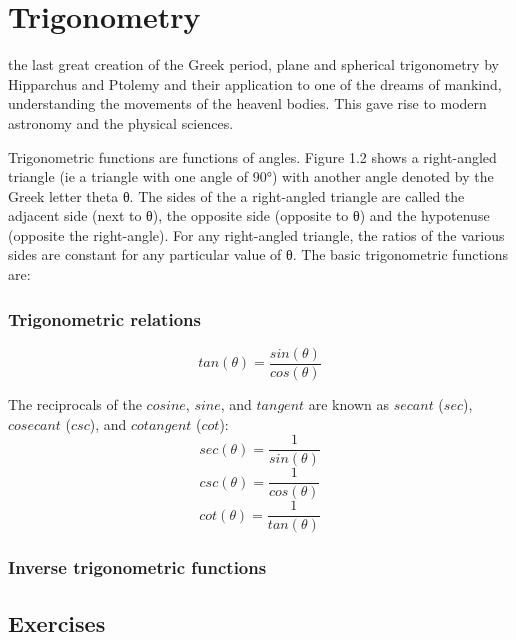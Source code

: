 \chapter{Trigonometry}

the  last  great  creation  of  the  Greek  period,  plane  and
 spherical  trigonometry  by  Hipparchus  and  Ptolemy  and  their  application  to
 one  of  the  dreams  of  mankind,  understanding  the  movements  of  the  heavenl bodies.  This  gave  rise  to  modern  astronomy  and  the  physical  sciences.



Trigonometric functions are functions of angles. Figure 1.2 shows a right-angled
triangle (ie a triangle with one angle of 90°) with another angle denoted by
the Greek letter theta θ. The sides of the a right-angled triangle are called
the adjacent side (next to θ), the opposite side (opposite to θ) and the
hypotenuse (opposite the right-angle). For any right-angled triangle, the
ratios of the various sides are constant for any particular value of θ. The
basic trigonometric functions are:

\subsection{Trigonometric relations}
\begin{equation}
    tan(\theta) = \frac{sin(\theta)}{cos(\theta)}
\end{equation}

The reciprocals of the $cosine$, $sine$, and $tangent$ are known as
$secant$ ($sec$), $cosecant$ ($csc$), and $cotangent$ ($cot$):
\begin{equation}
    sec(\theta) = \frac{1}{sin(\theta)}
\end{equation}
\begin{equation}
    csc(\theta) = \frac{1}{cos(\theta)}
\end{equation}
\begin{equation}
    cot(\theta) = \frac{1}{tan(\theta)}
\end{equation}

\subsection{Inverse trigonometric functions}

\section{Exercises}
\begin{ExerciseList}
\end{ExerciseList}
